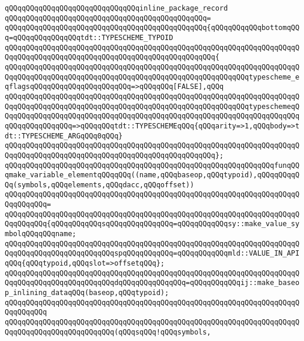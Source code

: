 \verb|qQQqqQQqqQQqqQQqqQQqqQQqqQQqqQQqinline_package_record|\newline
\verb|qQQqqQQqqQQqqQQqqQQqqQQqqQQqqQQqqQQqqQQqqQQqqQQq=|\newline
\verb|qQQqqQQqqQQqqQQqqQQqqQQqqQQqqQQqqQQqqQQqqQQqqQQq{qQQqqQQqqQQqbottomqQQq=qQQqqQQqqQQqqQQqtdt::TYPESCHEME_TYPOID|\newline
\verb|qQQqqQQqqQQqqQQqqQQqqQQqqQQqqQQqqQQqqQQqqQQqqQQqqQQqqQQqqQQqqQQqqQQqqQQqqQQqqQQqqQQqqQQqqQQqqQQqqQQqqQQqqQQqqQQqqQQqqQQq{|\newline
\verb|qQQqqQQqqQQqqQQqqQQqqQQqqQQqqQQqqQQqqQQqqQQqqQQqqQQqqQQqqQQqqQQqqQQqqQQqqQQqqQQqqQQqqQQqqQQqqQQqqQQqqQQqqQQqqQQqqQQqqQQqqQQqqQQqtypescheme_eqflagsqQQqqQQqqQQqqQQqqQQqqQQq=>qQQqqQQq[FALSE],qQQq|\newline
\verb|qQQqqQQqqQQqqQQqqQQqqQQqqQQqqQQqqQQqqQQqqQQqqQQqqQQqqQQqqQQqqQQqqQQqqQQqqQQqqQQqqQQqqQQqqQQqqQQqqQQqqQQqqQQqqQQqqQQqqQQqqQQqqQQqtypeschemeqQQqqQQqqQQqqQQqqQQqqQQqqQQqqQQqqQQqqQQqqQQqqQQqqQQqqQQqqQQqqQQqqQQqqQQqqQQqqQQqqQQqqQQq=>qQQqqQQqtdt::TYPESCHEMEqQQq{qQQqarity=>1,qQQqbody=>tdt::TYPESCHEME_ARGqQQq0qQQq}|\newline
\verb|qQQqqQQqqQQqqQQqqQQqqQQqqQQqqQQqqQQqqQQqqQQqqQQqqQQqqQQqqQQqqQQqqQQqqQQqqQQqqQQqqQQqqQQqqQQqqQQqqQQqqQQqqQQqqQQqqQQqqQQq};|\newline
\newline
\verb|qQQqqQQqqQQqqQQqqQQqqQQqqQQqqQQqqQQqqQQqqQQqqQQqqQQqqQQqqQQqqQQqfunqQQqmake_variable_elementqQQqqQQq((name,qQQqbaseop,qQQqtypoid),qQQqqQQqqQQq(symbols,qQQqelements,qQQqdacc,qQQqoffset))|\newline
\verb|qQQqqQQqqQQqqQQqqQQqqQQqqQQqqQQqqQQqqQQqqQQqqQQqqQQqqQQqqQQqqQQqqQQqqQQqqQQqqQQq=|\newline
\verb|qQQqqQQqqQQqqQQqqQQqqQQqqQQqqQQqqQQqqQQqqQQqqQQqqQQqqQQqqQQqqQQqqQQqqQQqqQQqqQQq{qQQqqQQqqQQqsqQQqqQQqqQQqqQQq=qQQqqQQqqQQqsy::make_value_symbolqQQqqQQqname;|\newline
\verb|qQQqqQQqqQQqqQQqqQQqqQQqqQQqqQQqqQQqqQQqqQQqqQQqqQQqqQQqqQQqqQQqqQQqqQQqqQQqqQQqqQQqqQQqqQQqqQQqspqQQqqQQqqQQq=qQQqqQQqqQQqmld::VALUE_IN_APIqQQq{qQQqtypoid,qQQqslot=>offsetqQQq};|\newline
\verb|qQQqqQQqqQQqqQQqqQQqqQQqqQQqqQQqqQQqqQQqqQQqqQQqqQQqqQQqqQQqqQQqqQQqqQQqqQQqqQQqqQQqqQQqqQQqqQQqdqQQqqQQqqQQqqQQq=qQQqqQQqqQQqij::make_baseop_inlining_dataqQQq(baseop,qQQqtypoid);|\newline
\verb|qQQqqQQqqQQqqQQqqQQqqQQqqQQqqQQqqQQqqQQqqQQqqQQqqQQqqQQqqQQqqQQqqQQqqQQqqQQqqQQq|\newline
\verb|qQQqqQQqqQQqqQQqqQQqqQQqqQQqqQQqqQQqqQQqqQQqqQQqqQQqqQQqqQQqqQQqqQQqqQQqqQQqqQQqqQQqqQQqqQQqqQQq(qQQqsqQQq!qQQqsymbols,|\newline
